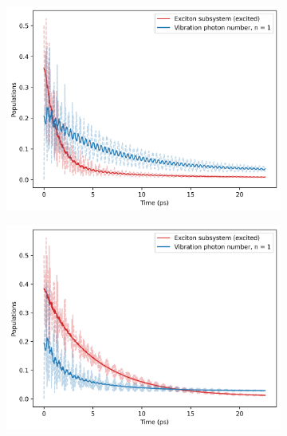 \documentclass[11pt]{article}
\newcounter{subsubsubsection}[subsubsection]
\begin{document}
\begin{figure}[H]
    \centering
    \begin{subfigure}{0.45\textwidth}
        \centering
        \includegraphics[width=\linewidth]{Research Project/Code/results/ExVib/Open/Population/pops_ex_spont_eg.png}
        \caption{}
        \label{fig:EVM_OQS_Pop_spont_eg}
    \end{subfigure}
    \hfill
    \begin{subfigure}{0.45\textwidth}
        \centering
        \includegraphics[width=\linewidth]{Research Project/Code/results/ExVib/Open/Population/pops_ex_therm_eg.png}
        \caption{}
        \label{fig:EVM_OQS_Pop_therm_eg}
    \end{subfigure}
    

\end{figure}
\end{document}
